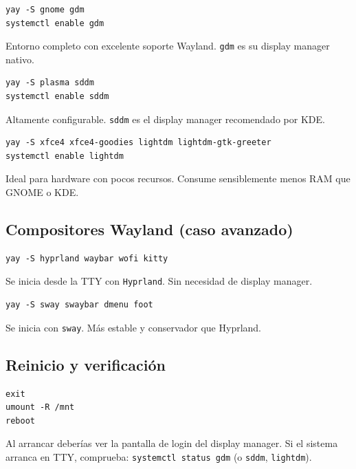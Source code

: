 \begin{tcolorbox}[title=Instalar \textbf{GNOME}]
\begin{lstlisting}[style=bashstyle]
yay -S gnome gdm
systemctl enable gdm
\end{lstlisting}
\tcblower
\scriptsize Entorno completo con excelente soporte Wayland. \texttt{gdm} es su display manager nativo.
\end{tcolorbox}

\begin{tcolorbox}[title=Instalar \textbf{KDE Plasma}]
\begin{lstlisting}[style=bashstyle]
yay -S plasma sddm
systemctl enable sddm
\end{lstlisting}
\tcblower
\scriptsize Altamente configurable. \texttt{sddm} es el display manager recomendado por KDE.
\end{tcolorbox}

\begin{tcolorbox}[title=Instalar \textbf{XFCE} (opción ligera)]
\begin{lstlisting}[style=bashstyle]
yay -S xfce4 xfce4-goodies lightdm lightdm-gtk-greeter
systemctl enable lightdm
\end{lstlisting}
\tcblower
\scriptsize Ideal para hardware con pocos recursos. Consume sensiblemente menos RAM que GNOME o KDE.
\end{tcolorbox}

\subsection{Compositores Wayland (caso avanzado)}

\begin{tcolorbox}[title=\textbf{Hyprland} — tiling compositor Wayland]
\begin{lstlisting}[style=bashstyle]
yay -S hyprland waybar wofi kitty
\end{lstlisting}
\tcblower
\scriptsize Se inicia desde la TTY con \texttt{Hyprland}. Sin necesidad de display manager.
\end{tcolorbox}

\begin{tcolorbox}[title=\textbf{Sway} — equivalente Wayland de i3]
\begin{lstlisting}[style=bashstyle]
yay -S sway swaybar dmenu foot
\end{lstlisting}
\tcblower
\scriptsize Se inicia con \texttt{sway}. Más estable y conservador que Hyprland.
\end{tcolorbox}

\subsection{Reinicio y verificación}

\begin{tcolorbox}[title=Salimos del chroot y reiniciamos]
\begin{lstlisting}[style=bashstyle]
exit
umount -R /mnt
reboot
\end{lstlisting}
\tcblower
\scriptsize Al arrancar deberías ver la pantalla de login del display manager.
Si el sistema arranca en TTY, comprueba: \texttt{systemctl status gdm} (o \texttt{sddm}, \texttt{lightdm}).
\end{tcolorbox}
